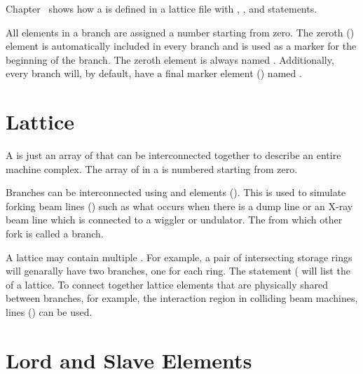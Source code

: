 Chapter~ shows how a  is defined in a
lattice file with , , and  statements.

All elements in a branch are assigned a number starting from zero. The
zeroth  () element is automatically
included in every branch and is used as a marker for the beginning of
the branch.  The zeroth element is always named .
Additionally, every branch will, by default, have a final marker
element () named .

\section{Lattice}
\label{s:lattice.def}

A  is just an array of  that
can be interconnected together to describe an entire machine complex.
The array of  in a  is numbered starting from
zero.

Branches can be interconnected using  and
 elements (). This is used to simulate
forking beam lines () such as what occurs when there
is a dump line or an X-ray beam line which is connected to a wiggler
or undulator. The  from which other  fork is
called a  branch.

A lattice may contain multiple  . For example, a
pair of intersecting storage rings will genarally have two 
branches, one for each ring. The  statement ( will
list the   of a lattice. To connect together
lattice elements that are physically shared between branches, for
example, the interaction region in colliding beam machines,
 lines () can be used.

\section{Lord and Slave Elements}
\label{s:lattice}

